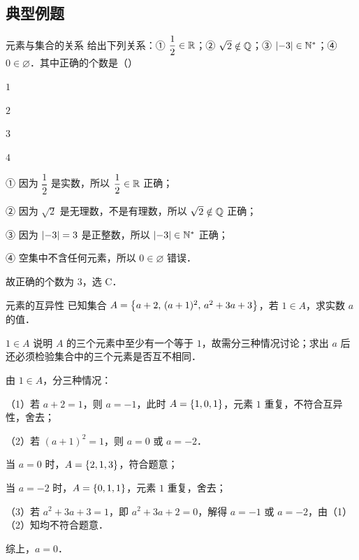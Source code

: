 \subsection{典型例题}

\begin{example}{元素与集合的关系}
给出下列关系：① $\dfrac{1}{2}\in\mathbb{R}$；② $\sqrt{2}\notin\mathbb{Q}$；③ $\left\lvert -3 \right\rvert\in\mathbb{N}^{*}$；④ $0\in\varnothing$．其中正确的个数是（\quad）

\begin{choices}
  \item $1$ \item $2$ \item $3$ \item $4$
\end{choices}

\begin{solution}
① 因为 $\dfrac{1}{2}$ 是实数，所以 $\dfrac{1}{2}\in\mathbb{R}$ 正确；

② 因为 $\sqrt{2}$ 是无理数，不是有理数，所以 $\sqrt{2}\notin\mathbb{Q}$ 正确；

③ 因为 $\left\lvert -3 \right\rvert=3$ 是正整数，所以 $\left\lvert -3 \right\rvert\in\mathbb{N}^{*}$ 正确；

④ 空集中不含任何元素，所以 $0\in\varnothing$ 错误．

故正确的个数为 $3$，选 C．
\end{solution}
\end{example}

\begin{example}{元素的互异性}
已知集合 $A=\left\{ a+2,\,(a+1)^{2},\,a^{2}+3a+3 \right\}$，若 $1\in A$，求实数 $a$ 的值．

\begin{analysis}
$1\in A$ 说明 $A$ 的三个元素中至少有一个等于 $1$，故需分三种情况讨论；求出 $a$ 后还必须检验集合中的三个元素是否互不相同．
\end{analysis}

\begin{solution}
由 $1\in A$，分三种情况：

（1）若 $a+2=1$，则 $a=-1$，此时 $A=\left\{ 1,0,1 \right\}$，元素 $1$ 重复，不符合互异性，舍去；

（2）若 $(a+1)^{2}=1$，则 $a=0$ 或 $a=-2$．

当 $a=0$ 时，$A=\left\{ 2,1,3 \right\}$，符合题意；

当 $a=-2$ 时，$A=\left\{ 0,1,1 \right\}$，元素 $1$ 重复，舍去；

（3）若 $a^{2}+3a+3=1$，即 $a^{2}+3a+2=0$，解得 $a=-1$ 或 $a=-2$，由（1）（2）知均不符合题意．

综上，$a=0$．
\end{solution}
\end{example}

